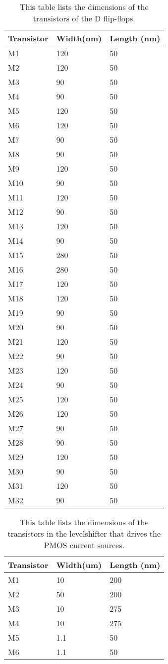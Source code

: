 \begin{appendices}
\begin{table}[h!]
\caption{This table lists the dimensions of the transistors of the D flip-flops.}
\begin{tabular}{l||l|l}\arraybackslash
Transistor & Width(nm) & Length (nm) \\\hline\hline
M1 & 120 & 50\\\hline
M2 & 120 & 50\\\hline
M3 & 90 & 50\\\hline
M4 & 90 & 50\\\hline
M5 & 120 & 50\\\hline
M6 & 120 & 50\\\hline
M7 & 90 & 50\\\hline
M8 & 90 & 50\\\hline
M9 & 120 & 50\\\hline
M10 & 90 & 50\\\hline
M11 & 120 & 50\\\hline
M12 & 90 & 50\\\hline
M13 & 120 & 50\\\hline
M14 & 90 & 50\\\hline
M15 & 280 & 50\\\hline
M16 & 280 & 50\\\hline
M17 & 120 & 50\\\hline
M18 & 120 & 50\\\hline
M19 & 90 & 50\\\hline
M20 & 90 & 50\\\hline
M21 & 120 & 50\\\hline
M22 & 90 & 50\\\hline
M23 & 120 & 50\\\hline
M24 & 90 & 50\\\hline
M25 & 120 & 50\\\hline
M26 & 120 & 50\\\hline
M27 & 90 & 50\\\hline
M28 & 90 & 50\\\hline
M29 & 120 & 50\\\hline
M30 & 90 & 50\\\hline
M31 & 120 & 50\\\hline
M32 & 90 & 50
\end{tabular}
\label{Tab:D_flip-flop_transistor_sizes}
\end{table}

\begin{table}[h!]
\caption{This table lists the dimensions of the transistors in the levelshifter that drives the PMOS current sources.}
\begin{tabular}{l||l|l}\arraybackslash
Transistor & Width(um) & Length (nm) \\\hline\hline
M1 & 10 & 200\\\hline
M2 & 50 & 200\\\hline
M3 & 10 & 275\\\hline
M4 & 10 & 275\\\hline
M5 & 1.1 & 50\\\hline
M6 & 1.1 & 50
\end{tabular}
\label{Tab:Levelshifter_PMOS_sizes}
\end{table}


\end{appendices}
